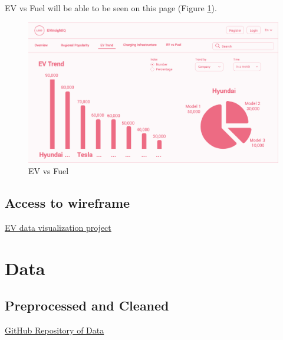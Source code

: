 \documentclass{article}
\begin{document}
EV vs Fuel will be able to be seen on this page (Figure \ref{fig:evfuel}).

\begin{figure}[h]
    \centering
    \includegraphics[scale=0.25]{EV Trend}
    \caption{EV vs Fuel}
    \label{fig:evfuel}
\end{figure}

\subsection*{Access to wireframe}
\href{https://claritee.io/view/12733/14589/92396/1bf7a5d4-b9c8-42aa-a914-98842533efbf}{EV data visualization project}\vspace*{5pt}\\

\section*{Data}
\subsection*{Preprocessed and Cleaned}
\href{https://github.com/mk-imagine/csc805g5/tree/main/data}{GitHub Repository of Data}
\end{document}
